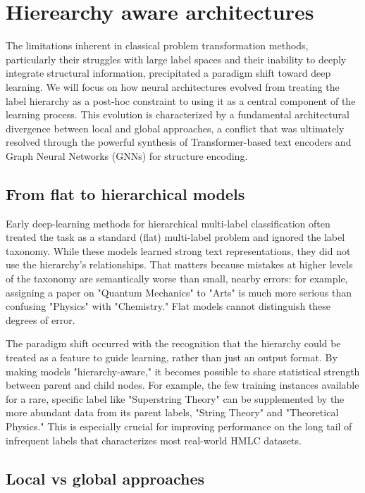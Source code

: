 \section{Hierearchy aware architectures}
The limitations inherent in classical problem transformation methods, particularly their struggles with large label spaces and their inability to deeply integrate structural information, precipitated a paradigm shift toward deep learning.
We will focus on how neural architectures evolved from treating the label hierarchy as a post-hoc constraint to using it as a central component of the learning process.
This evolution is characterized by a fundamental architectural divergence between local and global approaches, a conflict that was ultimately resolved through the powerful synthesis of Transformer-based text encoders and Graph Neural Networks (GNNs) for structure encoding.

\subsection{From flat to hierarchical models}
Early deep-learning methods for hierarchical multi-label classification often treated the task as a standard (flat) multi-label problem and ignored the label taxonomy. While these models learned strong text representations, they did not use the hierarchy's relationships. That matters because mistakes at higher levels of the taxonomy are semantically worse than small, nearby errors: for example, assigning a paper on "Quantum Mechanics" to "Arts" is much more serious than confusing "Physics" with "Chemistry." Flat models cannot distinguish these degrees of error. \cite{xu-etal-2021-hierarchical}

The paradigm shift occurred with the recognition that the hierarchy could be treated as a feature to guide learning, rather than just an output format. By making models "hierarchy-aware," it becomes possible to share statistical strength between parent and child nodes. For example, the few training instances available for a rare, specific label like "Superstring Theory" can be supplemented by the more abundant data from its parent labels, "String Theory" and "Theoretical Physics." This is especially crucial for improving performance on the long tail of infrequent labels that characterizes most real-world HMLC datasets. \cite{Zangari2024}

\subsection{Local vs global approaches}

